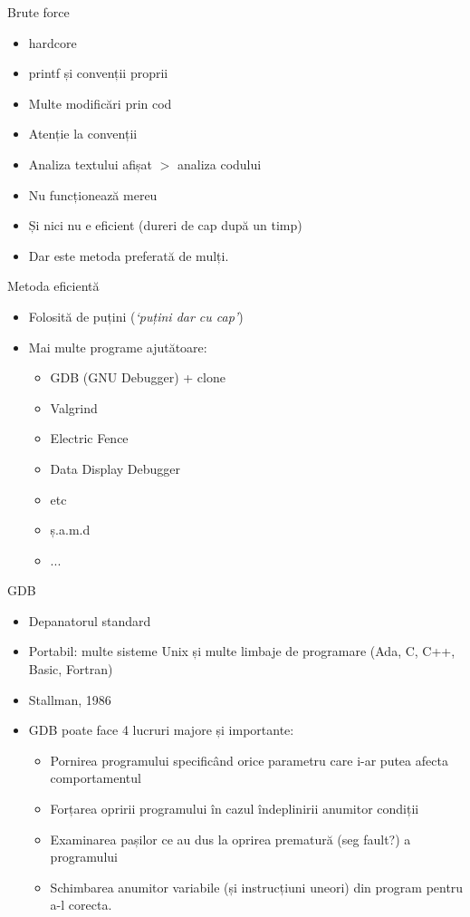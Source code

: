 \documentclass{beamer}
\begin{document}
\begin{frame}{Brute force}
\begin{itemize}
\item hardcore
\item \pause printf și convenții proprii
\item \pause Multe modificări prin cod
\item \pause Atenție la convenții
\item \pause Analiza textului afișat $>$ analiza codului
\item \pause Nu funcționează mereu
\item \pause Și nici nu e eficient \pause(dureri de cap după un timp)
\item \pause Dar este metoda preferată de mulți.
\end{itemize}
\end{frame}

\begin{frame}{Metoda eficientă}
\begin{itemize}
\item Folosită de puțini \pause(\textit{`puțini dar cu cap'})
\item \pause Mai multe programe ajutătoare:
\begin{itemize}
\item GDB (GNU Debugger) + clone
\item Valgrind
\item Electric Fence
\item Data Display Debugger
\item etc
\item ș.a.m.d
\item ...
\end{itemize}
\end{itemize}
\end{frame}

\begin{frame}{GDB}
\begin{itemize}
\item Depanatorul standard
\item Portabil: multe sisteme Unix și multe limbaje de programare (Ada, C, C++, Basic, Fortran)
\item Stallman, 1986
\item \pause GDB poate face 4 lucruri majore și importante:
\begin{itemize}
\item \pause Pornirea programului specificând orice parametru care i-ar putea afecta comportamentul
\item \pause Forțarea opririi programului în cazul îndeplinirii anumitor condiții
\item \pause Examinarea pașilor ce au dus la oprirea prematură (seg fault?) a programului
\item \pause Schimbarea anumitor variabile (și instrucțiuni uneori) din program pentru a-l corecta.
\end{itemize}
\end{itemize}
\end{frame}
\end{document}
